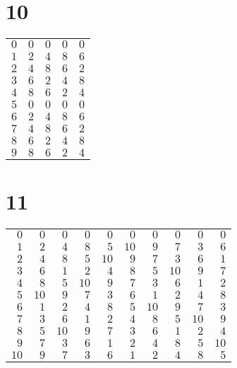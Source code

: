 \documentclass[a4paper]{scrartcl}
\begin{document}
\section*{10}
\begin{tabular}{rrrrr}
\toprule
$0$ & $0$ & $0$ & $0$ & $0$ \\
$1$ & $2$ & $4$ & $8$ & $6$ \\
$2$ & $4$ & $8$ & $6$ & $2$ \\
$3$ & $6$ & $2$ & $4$ & $8$ \\
$4$ & $8$ & $6$ & $2$ & $4$ \\
$5$ & $0$ & $0$ & $0$ & $0$ \\
$6$ & $2$ & $4$ & $8$ & $6$ \\
$7$ & $4$ & $8$ & $6$ & $2$ \\
$8$ & $6$ & $2$ & $4$ & $8$ \\
$9$ & $8$ & $6$ & $2$ & $4$ \\
\bottomrule
\end{tabular}

\section*{11}
\begin{tabular}{rrrrrrrrrr}
\toprule
$0$ & $0$ & $0$ & $0$ & $0$ & $0$ & $0$ & $0$ & $0$ & $0$ \\
$1$ & $2$ & $4$ & $8$ & $5$ & $10$ & $9$ & $7$ & $3$ & $6$ \\
$2$ & $4$ & $8$ & $5$ & $10$ & $9$ & $7$ & $3$ & $6$ & $1$ \\
$3$ & $6$ & $1$ & $2$ & $4$ & $8$ & $5$ & $10$ & $9$ & $7$ \\
$4$ & $8$ & $5$ & $10$ & $9$ & $7$ & $3$ & $6$ & $1$ & $2$ \\
$5$ & $10$ & $9$ & $7$ & $3$ & $6$ & $1$ & $2$ & $4$ & $8$ \\
$6$ & $1$ & $2$ & $4$ & $8$ & $5$ & $10$ & $9$ & $7$ & $3$ \\
$7$ & $3$ & $6$ & $1$ & $2$ & $4$ & $8$ & $5$ & $10$ & $9$ \\
$8$ & $5$ & $10$ & $9$ & $7$ & $3$ & $6$ & $1$ & $2$ & $4$ \\
$9$ & $7$ & $3$ & $6$ & $1$ & $2$ & $4$ & $8$ & $5$ & $10$ \\
$10$ & $9$ & $7$ & $3$ & $6$ & $1$ & $2$ & $4$ & $8$ & $5$ \\
\bottomrule
\end{tabular}
\end{document}
